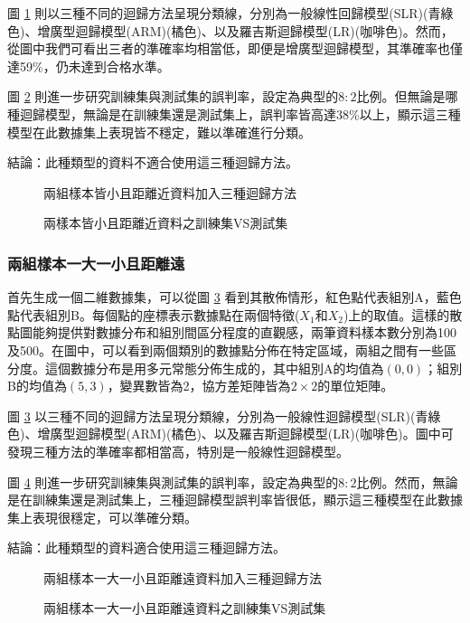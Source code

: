圖 \ref{fig:rdn2-LARline} 則以三種不同的迴歸方法呈現分類線，分別為一般線性回歸模型(SLR)(青綠色)、增廣型迴歸模型(ARM)(橘色)、以及羅吉斯迴歸模型(LR)(咖啡色)。然而，從圖中我們可看出三者的準確率均相當低，即便是增廣型迴歸模型，其準確率也僅達59\%，仍未達到合格水準。

圖 \ref{fig:rdn2-LARline2} 則進一步研究訓練集與測試集的誤判率，設定為典型的$8:2$比例。但無論是哪種迴歸模型，無論是在訓練集還是測試集上，誤判率皆高達38\%以上，顯示這三種模型在此數據集上表現皆不穩定，難以準確進行分類。

結論：此種類型的資料不適合使用這三種迴歸方法。
\begin{figure}[h]
    \caption{兩組樣本皆小且距離近資料加入三種迴歸方法}
    \label{fig:rdn2-LARline}
\end{figure}
\begin{figure}[h]
    \caption{兩樣本皆小且距離近資料之訓練集VS測試集}
    \label{fig:rdn2-LARline2}
\end{figure}
\subsubsection{兩組樣本一大一小且距離遠}
首先生成一個二維數據集，可以從圖 \ref{fig:rdn3-LARline} 看到其散佈情形，紅色點代表組別A，藍色點代表組別B。每個點的座標表示數據點在兩個特徵($X_1$和$X_2$)上的取值。這樣的散點圖能夠提供對數據分布和組別間區分程度的直觀感，兩筆資料樣本數分別為100及500。在圖中，可以看到兩個類別的數據點分佈在特定區域，兩組之間有一些區分度。這個數據分布是用多元常態分佈生成的，其中組別A的均值為$(0, 0)$；組別B的均值為$(5, 3)$，變異數皆為2，協方差矩陣皆為$2 \times 2$的單位矩陣。

圖 \ref{fig:rdn3-LARline} 以三種不同的迴歸方法呈現分類線，分別為一般線性迴歸模型(SLR)(青綠色)、增廣型迴歸模型(ARM)(橘色)、以及羅吉斯迴歸模型(LR)(咖啡色)。圖中可發現三種方法的準確率都相當高，特別是一般線性迴歸模型。

圖 \ref{fig:rdn3-LARline2} 則進一步研究訓練集與測試集的誤判率，設定為典型的$8:2$比例。然而，無論是在訓練集還是測試集上，三種迴歸模型誤判率皆很低，顯示這三種模型在此數據集上表現很穩定，可以準確分類。

結論：此種類型的資料適合使用這三種迴歸方法。
\begin{figure}[H]
    \caption{兩組樣本一大一小且距離遠資料加入三種迴歸方法}
    \label{fig:rdn3-LARline}
\end{figure}
\begin{figure}[H]
    \caption{兩組樣本一大一小且距離遠資料之訓練集VS測試集}
    \label{fig:rdn3-LARline2}
\end{figure}

